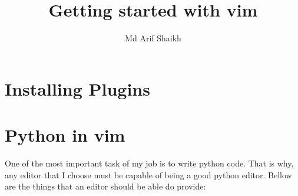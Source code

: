 \documentclass{article}
\begin{document}
\title{Getting started with vim}
\author{Md Arif Shaikh}
\maketitle
\tableofcontents

\section{Installing Plugins}
\label{sec:installing-plugins}

\section{Python in vim}
\label{sec:python-in-vim}
One of the most important task of my job is to write python code. That is why,
any editor that I choose must be capable of being a good python editor. Bellow
are the things that an editor should be able do provide:
\end{document}
